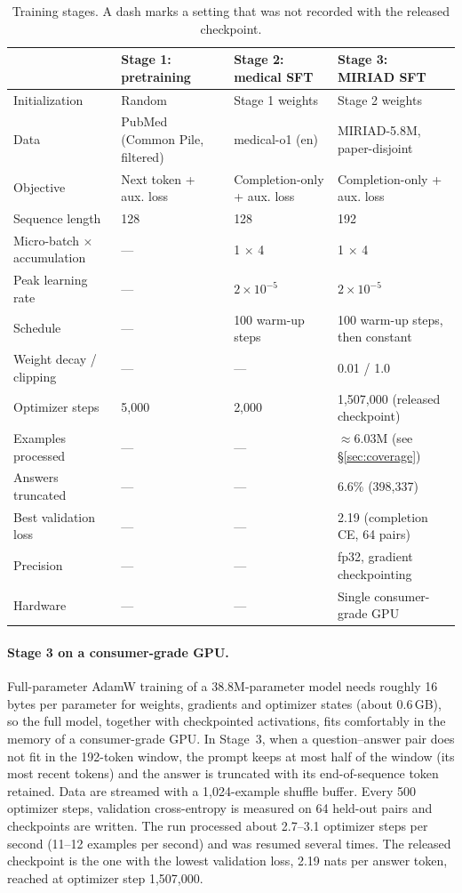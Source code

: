 \documentclass[11pt,a4paper]{article}
\begin{document}
\begin{table}[t]
\centering
\caption{Training stages. A dash marks a setting that was not recorded with the released checkpoint.}
\label{tab:train}
\small
\begin{tabularx}{\textwidth}{@{}lYYY@{}}
\toprule
 & Stage 1: pretraining & Stage 2: medical SFT & Stage 3: MIRIAD SFT \\
\midrule
Initialization & Random & Stage 1 weights & Stage 2 weights \\
Data & PubMed (Common Pile, filtered) & medical-o1 (en) & MIRIAD-5.8M, paper-disjoint \\
Objective & Next token + aux. loss & Completion-only + aux. loss & Completion-only + aux. loss \\
Sequence length & 128 & 128 & 192 \\
Micro-batch $\times$ accumulation & --- & 1 $\times$ 4 & 1 $\times$ 4 \\
Peak learning rate & --- & $2\times10^{-5}$ & $2\times10^{-5}$ \\
Schedule & --- & 100 warm-up steps & 100 warm-up steps, then constant \\
Weight decay / clipping & --- & --- & 0.01 / 1.0 \\
Optimizer steps & 5,000 & 2,000 & 1,507,000 (released checkpoint) \\
Examples processed & --- & --- & $\approx$6.03M (see \S\ref{sec:coverage}) \\
Answers truncated & --- & --- & 6.6\% (398,337) \\
Best validation loss & --- & --- & 2.19 (completion CE, 64 pairs) \\
Precision & --- & --- & fp32, gradient checkpointing \\
Hardware & --- & --- & Single consumer-grade GPU \\
\bottomrule
\end{tabularx}
\end{table}

\paragraph{Stage 3 on a consumer-grade GPU.} Full-parameter AdamW training of a 38.8M-parameter model needs roughly 16 bytes per parameter for weights, gradients and optimizer states (about 0.6\,GB), so the full model, together with checkpointed activations, fits comfortably in the memory of a consumer-grade GPU. In Stage~3, when a question--answer pair does not fit in the 192-token window, the prompt keeps at most half of the window (its most recent tokens) and the answer is truncated with its end-of-sequence token retained. Data are streamed with a 1,024-example shuffle buffer. Every 500 optimizer steps, validation cross-entropy is measured on 64 held-out pairs and checkpoints are written. The run processed about 2.7--3.1 optimizer steps per second (11--12 examples per second) and was resumed several times. The released checkpoint is the one with the lowest validation loss, 2.19 nats per answer token, reached at optimizer step 1,507,000.
\end{document}
